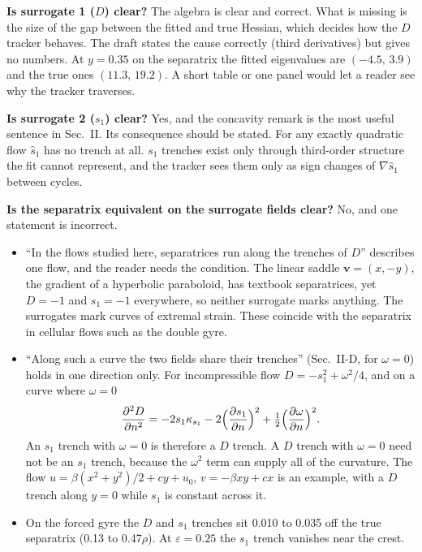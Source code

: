 \documentclass[10.5pt]{article}
\newcommand{\shat}{\hat{s}_1}
\begin{document}
\textbf{Is surrogate 1 ($D$) clear?} The algebra is clear and correct. What is missing is the size of the gap between the fitted and true Hessian, which decides how the $D$ tracker behaves. The draft states the cause correctly (third derivatives) but gives no numbers. At $y=0.35$ on the separatrix the fitted eigenvalues are $(-4.5,\,3.9)$ and the true ones $(11.3,\,19.2)$. A short table or one panel would let a reader see why the tracker traverses.

\textbf{Is surrogate 2 ($s_1$) clear?} Yes, and the concavity remark is the most useful sentence in Sec.~II. Its consequence should be stated. For any exactly quadratic flow $\shat$ has no trench at all. $s_1$ trenches exist only through third-order structure the fit cannot represent, and the tracker sees them only as sign changes of $\nabla\shat$ between cycles.

\textbf{Is the separatrix equivalent on the surrogate fields clear?} No, and one statement is incorrect.
\begin{itemize}[leftmargin=1.2em]
\item ``In the flows studied here, separatrices run along the trenches of $D$'' describes one flow, and the reader needs the condition. The linear saddle $\mathbf v=(x,-y)$, the gradient of a hyperbolic paraboloid, has textbook separatrices, yet $D=-1$ and $s_1=-1$ everywhere, so neither surrogate marks anything. The surrogates mark curves of extremal strain. These coincide with the separatrix in cellular flows such as the double gyre.
\item ``Along such a curve the two fields share their trenches'' (Sec.~II-D, for $\omega=0$) holds in one direction only. For incompressible flow $D=-s_1^2+\omega^2/4$, and on a curve where $\omega=0$
\[
\frac{\partial^2 D}{\partial n^2} = -2s_1\kappa_{s_1} - 2\Bigl(\frac{\partial s_1}{\partial n}\Bigr)^2 + \tfrac12\Bigl(\frac{\partial \omega}{\partial n}\Bigr)^2 .
\]
An $s_1$ trench with $\omega=0$ is therefore a $D$ trench. A $D$ trench with $\omega=0$ need not be an $s_1$ trench, because the $\omega^2$ term can supply all of the curvature. The flow $u=\beta(x^2+y^2)/2+cy+u_0$, $v=-\beta xy+cx$ is an example, with a $D$ trench along $y=0$ while $s_1$ is constant across it.
\item On the forced gyre the $D$ and $s_1$ trenches sit 0.010 to 0.035 off the true separatrix (0.13 to 0.47$\rho$). At $\varepsilon=0.25$ the $s_1$ trench vanishes near the crest.
\end{itemize}
\end{document}
